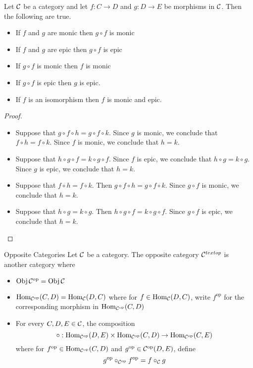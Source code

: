 \documentclass[a4paper]{article}
\begin{document}
\begin{prp}{}{} Let $\mathcal{C}$ be a category and let $f:C\to D$ and $g:D\to E$ be morphisms in $\mathcal{C}$. Then the following are true. 
\begin{itemize}
\item If $f$ and $g$ are monic then $g\circ f$ is monic
\item If $f$ and $g$ are epic then $g\circ f$ is epic
\item If $g\circ f$ is monic then $f$ is monic
\item If $g\circ f$ is epic then $g$ is epic. 
\item If $f$ is an isomorphism then $f$ is monic and epic. 
\end{itemize} \tcbline
\begin{proof}~\\
\begin{itemize}
\item Suppose that $g\circ f\circ h=g\circ f\circ k$. Since $g$ is monic, we conclude that $f\circ h=f\circ k$. Since $f$ is monic, we conclude that $h=k$. 
\item Suppose that $h\circ g\circ f=k\circ g\circ f$. Since $f$ is epic, we conclude that $h\circ g=k\circ g$. Since $g$ is epic, we conclude that $h=k$. 
\item Suppose that $f\circ h=f\circ k$. Then $g\circ f\circ h=g\circ f\circ k$. Since $g\circ f$ is monic, we conclude that $h=k$. 
\item Suppose that $h\circ g=k\circ g$. Then $h\circ g\circ f=k\circ g\circ f$. Since $g\circ f$ is epic, we conclude that $h=k$. 
\end{itemize}
\end{proof}
\end{prp}

\begin{defn}{Opposite Categories}{} Let $\mathcal{C}$ be a category. The opposite category $\mathcal{C}^{text{op}}$ is another category where
\begin{itemize}
\item $\operatorname{Obj}\mathcal{C}^{\text{op}}=\operatorname{Obj}\mathcal{C}$
\item $\operatorname{Hom}_{\mathcal{C}^{\text{op}}}(C,D)=\operatorname{Hom}_{\mathcal{C}}(D,C)$ where for $f\in\operatorname{Hom}_{\mathcal{C}}(D,C)$, write $f^{\text{op}}$ for the corresponding morphism in $\operatorname{Hom}_{\mathcal{C}^{\text{op}}}(C,D)$
\item For every $C,D,E\in\mathcal{C}$, the composition $$\circ:\operatorname{Hom}_{\mathcal{C}^{\text{op}}}(D,E)\times\operatorname{Hom}_{\mathcal{C}^{\text{op}}}(C,D)\to\operatorname{Hom}_{\mathcal{C}^{\text{op}}}(C,E)$$ where for $f^{\text{op}}\in\operatorname{Hom}_{\mathcal{C}^{\text{op}}}(C,D)$ and $g^{\text{op}}\in{\mathcal{C}^{\text{op}}}(D,E)$, define $$g^{\text{op}}\circ_{\mathcal{C}^{\text{op}}}f^{\text{op}}=f\circ_{\mathcal{C}} g$$
\end{itemize}
\end{defn}
\end{document}
